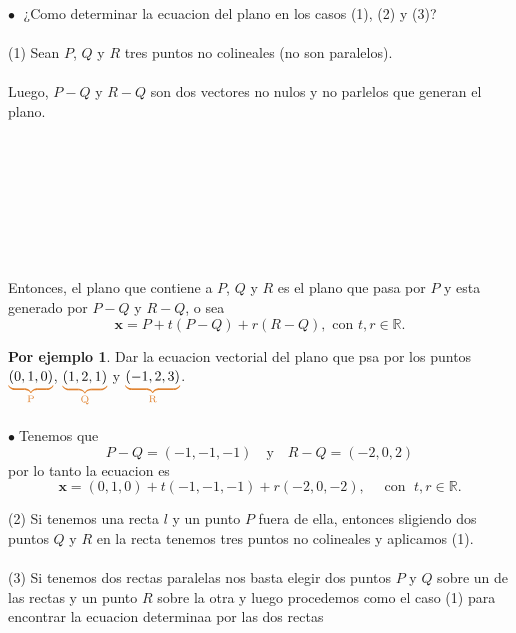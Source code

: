 \documentclass{article}
\theoremstyle{definition}
\theoremstyle{definition}
\newtheorem*{ej}{Por ejemplo}
\theoremstyle{remark}
\newcommand\bl{$\bullet\;$}
\begin{document}
\textcolor{rojop2}{\bl} ¿Como determinar la ecuacion del plano en los casos \textcolor{rojop2}{(1)}, \textcolor{rojop2}{(2)} y \textcolor{rojop2}{(3)}? 
\\\\
\textcolor{rojop2}{(1)} Sean $P$, $Q$ y $R$ tres puntos no colineales \big(no son paralelos\big).\\ 
\\ Luego, $P-Q$ y $R-Q$ son dos vectores no nulos y no parlelos que generan el plano.\\\\\\\\\\\\\\\; \\\\
Entonces, el plano que contiene a $P$, $Q$ y $R$  es el plano que pasa por $P$ y esta generado por $P-Q$ y $R-Q$, o sea \[
  \mathbf{x}=P+t(P-Q)+r(R-Q), \text{ con } t, r \in \mathbb{R}.
\] \;
\begin{figure}[h]
\centering
\def\svgwidth{1\textwidth}

\end{figure}

\begin{ej}
  Dar la ecuacion vectorial del plano que psa por los puntos $\textcolor{rojop2}{\underbrace{\textcolor{black}{(0,1,0)}}_{\text{P}}}$, $\textcolor{rojop2}{\underbrace{\textcolor{black}{(1,2,1)}}_{\text{Q}}}$ y $\textcolor{rojop2}{\underbrace{\textcolor{black}{(-1,2,3)}}_{\text{R}}}$. \\\\ 
  \bl Tenemos que \[ 
    P-Q = (-1,-1,-1) \quad \text{y} \quad R-Q=(-2,0,2)
  \] por lo tanto la ecuacion es $$\mathbf{x}=(0,1,0)+t(-1,-1,-1)+r(-2,0,-2), \quad \text{ con } \; t, r \in \mathbb{R}.$$
\end{ej}
\pagebreak
\textcolor{rojop2}{(2)} Si tenemos una recta $l$ y un punto $P$ fuera de ella, entonces sligiendo dos puntos $Q$ y $R$ en la recta tenemos tres puntos no colineales y aplicamos \textcolor{rojop2}{(1)}. \\\\
\textcolor{rojop2}{(3)} Si tenemos dos rectas paralelas nos basta elegir dos puntos $P$ y $Q$ sobre un de las rectas y un punto $R$ sobre la otra y luego procedemos como el caso \textcolor{rojop2}{(1)} para encontrar la ecuacion determinaa por las dos rectas
\end{document}
